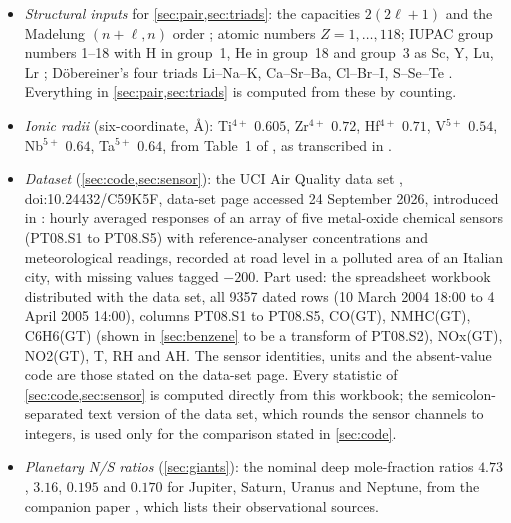 \documentclass[11pt]{article}
\theoremstyle{definition}\newtheorem{definition}[theorem]{Definition}
\theoremstyle{remark}\newtheorem{remark}[theorem]{Remark}
\begin{document}
\begin{itemize}
\item \emph{Structural inputs} for \cref{sec:pair,sec:triads}: the capacities $2(2\ell+1)$ and the Madelung $(n+\ell,n)$ order \cite{AllenKnight}; atomic numbers $Z=1,\dots,118$; IUPAC group numbers 1--18 with H in group~1, He in group~18 and group~3 as Sc, Y, Lu, Lr \cite{ScerriG3}; D\"obereiner's four triads Li--Na--K, Ca--Sr--Ba, Cl--Br--I, S--Se--Te \cite{Dob1829,Scerri2008}. Everything in \cref{sec:pair,sec:triads} is computed from these by counting.
\item \emph{Ionic radii} (six-coordinate, \AA): Ti$^{4+}$ $0.605$, Zr$^{4+}$ $0.72$, Hf$^{4+}$ $0.71$, V$^{5+}$ $0.54$, Nb$^{5+}$ $0.64$, Ta$^{5+}$ $0.64$, from Table~1 of \cite{Shannon}, as transcribed in \cite{ShannonDB}.
\item \emph{Dataset} (\cref{sec:code,sec:sensor}): the UCI Air Quality data set \cite{UCI}, doi:10.24432/C59K5F, data-set page accessed 24 September 2026, introduced in \cite{DeVito}: hourly averaged responses of an array of five metal-oxide chemical sensors (PT08.S1 to PT08.S5) with reference-analyser concentrations and meteorological readings, recorded at road level in a polluted area of an Italian city, with missing values tagged $-200$. Part used: the spreadsheet workbook distributed with the data set, all 9357 dated rows (10 March 2004 18:00 to 4 April 2005 14:00), columns PT08.S1 to PT08.S5, CO(GT), NMHC(GT), C6H6(GT) (shown in \cref{sec:benzene} to be a transform of PT08.S2), NOx(GT), NO2(GT), T, RH and AH. The sensor identities, units and the absent-value code are those stated on the data-set page. Every statistic of \cref{sec:code,sec:sensor} is computed directly from this workbook; the semicolon-separated text version of the data set, which rounds the sensor channels to integers, is used only for the comparison stated in \cref{sec:code}.
\item \emph{Planetary N/S ratios} (\cref{sec:giants}): the nominal deep mole-fraction ratios $4.73$, $3.16$, $0.195$ and $0.170$ for Jupiter, Saturn, Uranus and Neptune, from the companion paper \cite{Planet}, which lists their observational sources.
\end{itemize}
\end{document}
